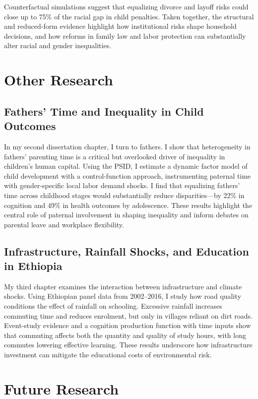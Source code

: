 \documentclass[11pt,a4paper]{article}
\begin{document}
Counterfactual simulations suggest that equalizing divorce and layoff risks could close up to 75\% of the racial gap in child penalties. Taken together, the structural and reduced-form evidence highlight how institutional risks shape household decisions, and how reforms in family law and labor protection can substantially alter racial and gender inequalities.

\section{Other Research}

\subsection{Fathers' Time and Inequality in Child Outcomes}

In my second dissertation chapter, I turn to fathers. I show that heterogeneity in fathers' parenting time is a critical but overlooked driver of inequality in children's human capital. Using the PSID, I estimate a dynamic factor model of child development with a control-function approach, instrumenting paternal time with gender-specific local labor demand shocks. I find that equalizing fathers' time across childhood stages would substantially reduce disparities—by 22\% in cognition and 49\% in health outcomes by adolescence. These results highlight the central role of paternal involvement in shaping inequality and inform debates on parental leave and workplace flexibility.

\subsection{Infrastructure, Rainfall Shocks, and Education in Ethiopia}

My third chapter examines the interaction between infrastructure and climate shocks. Using Ethiopian panel data from 2002–2016, I study how road quality conditions the effect of rainfall on schooling. Excessive rainfall increases commuting time and reduces enrolment, but only in villages reliant on dirt roads. Event-study evidence and a cognition production function with time inputs show that commuting affects both the quantity and quality of study hours, with long commutes lowering effective learning. These results underscore how infrastructure investment can mitigate the educational costs of environmental risk.

\section{Future Research}
\end{document}
